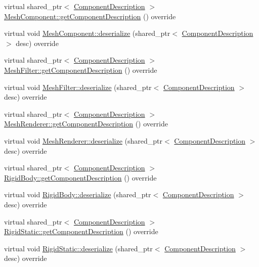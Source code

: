 \begin{DoxyCompactItemize}
\item 
virtual shared\+\_\+ptr$<$ \hyperlink{class_component_description}{Component\+Description} $>$ \hyperlink{group__serialization__functions_ga10950983c0abed7fc5381383e211904f}{Mesh\+Component\+::get\+Component\+Description} () override
\item 
virtual void \hyperlink{group__serialization__functions_gac2630e3fbb6a7eeb6b2f6d40e2a67bfa}{Mesh\+Component\+::deserialize} (shared\+\_\+ptr$<$ \hyperlink{class_component_description}{Component\+Description} $>$ desc) override
\item 
virtual shared\+\_\+ptr$<$ \hyperlink{class_component_description}{Component\+Description} $>$ \hyperlink{group__serialization__functions_ga3f175929ed6c3d53b330eca5de9c5a13}{Mesh\+Filter\+::get\+Component\+Description} () override
\item 
virtual void \hyperlink{group__serialization__functions_gae0449262f3398c229e95911f69930acb}{Mesh\+Filter\+::deserialize} (shared\+\_\+ptr$<$ \hyperlink{class_component_description}{Component\+Description} $>$ desc) override
\item 
virtual shared\+\_\+ptr$<$ \hyperlink{class_component_description}{Component\+Description} $>$ \hyperlink{group__serialization__functions_gaf9b3799dcfb2bc87f5ce21c34c9fbaff}{Mesh\+Renderer\+::get\+Component\+Description} () override
\item 
virtual void \hyperlink{group__serialization__functions_ga210ca500925eeb32174581ef37ea5b59}{Mesh\+Renderer\+::deserialize} (shared\+\_\+ptr$<$ \hyperlink{class_component_description}{Component\+Description} $>$ desc) override
\item 
virtual shared\+\_\+ptr$<$ \hyperlink{class_component_description}{Component\+Description} $>$ \hyperlink{group__serialization__functions_ga0db7f5a90aa3397d0b3e0d2ae1ed1208}{Rigid\+Body\+::get\+Component\+Description} () override
\item 
virtual void \hyperlink{group__serialization__functions_ga02c21f54650f36d529b4622efc9df372}{Rigid\+Body\+::deserialize} (shared\+\_\+ptr$<$ \hyperlink{class_component_description}{Component\+Description} $>$ desc) override
\item 
virtual shared\+\_\+ptr$<$ \hyperlink{class_component_description}{Component\+Description} $>$ \hyperlink{group__serialization__functions_ga74f14a6073ed781cc12f42c0a936515a}{Rigid\+Static\+::get\+Component\+Description} () override
\item 
virtual void \hyperlink{group__serialization__functions_ga80ddd737e7b8b80a997a0c6681925a26}{Rigid\+Static\+::deserialize} (shared\+\_\+ptr$<$ \hyperlink{class_component_description}{Component\+Description} $>$ desc) override

\end{DoxyCompactItemize}
